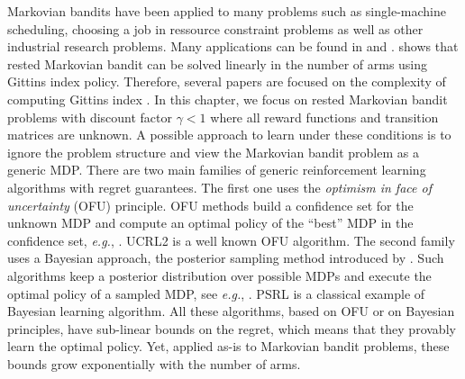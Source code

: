 Markovian bandits have been applied to many problems such as single-machine scheduling, choosing a job in  ressource constraint problems  as well as other  industrial research problems. Many applications can be found in \cite[Section 3.6]{puterman2014markov} and \cite{gittins2011multi}. \cite{gittins1979bandit} shows that rested Markovian bandit can be solved linearly in the number of arms using Gittins index policy. Therefore, several papers are   focused  on the complexity of  computing  Gittins index \cite{chakravorty2014multi,gast2022computing}.
In this chapter, we focus on rested Markovian bandit problems with discount factor $\gamma<1$ where all
reward functions and transition matrices are
unknown. A possible approach to learn under these conditions is to ignore the problem structure and view the Markovian bandit problem as a generic MDP. There are two main families of generic reinforcement learning algorithms with regret guarantees. The first one uses the \emph{optimism in face of uncertainty} (OFU) principle.  OFU methods build a confidence set
for the unknown MDP and compute an  optimal policy of the ``best'' MDP in the
confidence set, \emph{e.g.}, \cite{bourel2020tightening,zhang2019regret,talebi2018variance,fruit2017regret,azar2017minimax,bartlett2012regal,jaksch2010near}. UCRL2 \cite{jaksch2010near} is a well known OFU algorithm.  The second family uses a Bayesian approach, the posterior sampling method introduced by \cite{thompson1933likelihood}.  Such algorithms keep a
posterior distribution over possible MDPs and execute the optimal policy of a sampled MDP, see \emph{e.g.}, \cite{ouyang2017learning,agrawal2017posterior,gopalan2015thompson,osband2013more}. PSRL \cite{osband2013more} is a classical example of Bayesian learning algorithm.  All these algorithms, based on OFU or on Bayesian principles, have sub-linear bounds on the regret, which means that they provably learn the optimal policy. Yet, applied as-is to Markovian bandit problems, these bounds grow exponentially with the number of arms.

